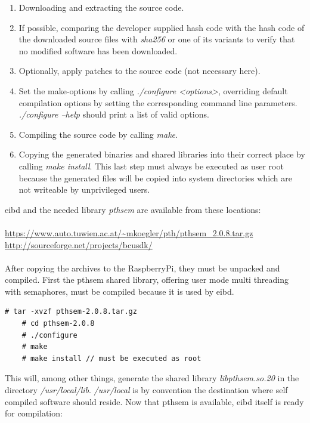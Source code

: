 \begin{enumerate}
 \item Downloading and extracting the source code.
 \item If possible, comparing the developer supplied hash code with the hash code of the downloaded source files with
 \textit{sha256} or one of its variants to verify that no modified software has been downloaded.
 \item Optionally, apply patches to the source code (not necessary here).
 \item Set the make-options by calling \textit{./configure <options>}, overriding default compilation options by setting the corresponding command line parameters.
 \textit{./configure --help} should print a list of valid options.
 \item Compiling the source code by calling \textit{make}.
 \item Copying the generated binaries and shared libraries into their correct place by calling \textit{make install}. This last step must always be executed
 as user root because the generated files will be copied into system directories which are not writeable by unprivileged users.
\end{enumerate}
\gls{eibd} and the needed library \textit{pthsem} are available from these locations:
\\
\\
\url{https://www.auto.tuwien.ac.at/~mkoegler/pth/pthsem_2.0.8.tar.gz}\\
\url{http://sourceforge.net/projects/bcusdk/}
\\
\\
After copying the archives to the RaspberryPi, they must be unpacked and compiled. First the pthsem shared library, offering user mode multi
threading with semaphores, must be compiled because it is used by \gls{eibd}. 
\begin{lstlisting}[style=BashInputStyle]
    # tar -xvzf pthsem-2.0.8.tar.gz
    # cd pthsem-2.0.8
    # ./configure
    # make
    # make install // must be executed as root
\end{lstlisting}
This will, among other things, generate the shared library \textit{libpthsem.so.20} in the directory \textit{/usr/local/lib}. \textit{/usr/local}
 is by convention the destination where self compiled software should reside.
Now that pthsem is available, \gls{eibd} itself is ready for compilation:

